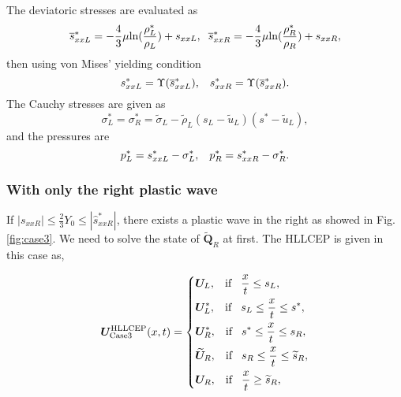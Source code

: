 \documentclass{article}
\theoremstyle{plain}\newtheorem{definition}{\sc{Definition}}
\theoremstyle{defination}\newtheorem{example}{Example}[section]
\numberwithin{equation}{section}
\numberwithin{table}{section}
\begin{document}
The deviatoric stresses are evaluated as 
\begin{equation}
  \overline{s}_{xxL}^*=-\frac{4}{3}\mu\text{ln}(\frac{\rho_L^*}{\rho_L})+s_{xxL},\hspace{0.2cm}  \overline{s}_{xxR}^*=-\frac{4}{3}\mu\text{ln}(\frac{\rho_R^*}{\rho_R})+s_{xxR},
\end{equation}
then using von Mises' yielding condition 
\begin{equation}
  s_{xxL}^* = \Upsilon(\overline{s}_{xxL}^*), \hspace{0.3cm}  s_{xxR}^* = \Upsilon(\overline{s}_{xxR}^*). 
\end{equation}
The Cauchy stresses are given as
\begin{equation}
  \sigma_L^*=\sigma_R^*=\widetilde{\sigma}_L -\widetilde{\rho}_L (s_L-\widetilde{u}_L)(s^*-\widetilde{u}_L),
\end{equation}
and the pressures are 
\begin{equation}
  p_L^* = s_{xxL}^* - \sigma_L^*, \hspace{0.3cm}   p_R^* = s_{xxR}^* - \sigma_R^*.
\end{equation}

\subsubsection {With only the  right plastic wave}
If  $|s_{xxR}| \le \frac{2}{3}Y_0 \le  |\hat{s}_{xxR}^*|$, there exists a plastic wave in the right as showed in Fig.\ref{fig:case3}. We need to solve the state  of $\widetilde{\bm{Q}}_R$ at first. The HLLCEP is given in this case as,

 \begin{equation}\label{eq:HLLCEP3}
   \bm{U}^{\text{HLLCEP}}_{\text{Case3}}(x,t) = \left\{ \begin{aligned}
		& \bm{U}_L, \hspace{0.3cm} \text{if} \hspace{0.3cm} \frac{x}{t}\le s_L, \\
		& \bm{U}_L^*, \hspace{0.3cm} \text{if} \hspace{0.3cm} s_L \le \frac{x}{t} \le s^*, \\
		& \bm{U}_R^*, \hspace{0.3cm} \text{if} \hspace{0.3cm} s^*\le \frac{x}{t} \le s_R, \\
		& \widetilde{\bm{U}}_R, \hspace{0.3cm} \text{if} \hspace{0.3cm} s_R \le \frac{x}{t} \le \widetilde{s}_R,\\
		& \bm{U}_R, \hspace{0.3cm} \text{if} \hspace{0.3cm} \frac{x}{t}\ge \widetilde{s}_R, \\
	  \end{aligned}
	\right.
  \end{equation}
\end{document}
